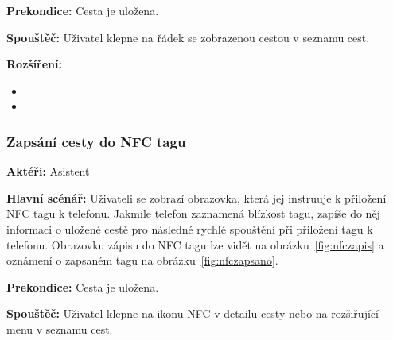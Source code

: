 \documentclass[czech,master,public,dept460,male,java,cpdeclaration]{diploma}
\newcommand{\usecase}[2]{\subsubsection{#1}\label{#2}}
\begin{document}
\vspace{0.1cm}
\noindent
\textbf{Prekondice:} Cesta je uložena.

\vspace{0.1cm}
\noindent
\textbf{Spouštěč:} Uživatel klepne na řádek se zobrazenou cestou v seznamu cest.

\vspace{0.1cm}
\noindent
\textbf{Rozšíření:}
\begin{itemize}
  \item {}
  \item {}
\end{itemize}






\usecase{Zapsání cesty do NFC tagu}{nfczapis}
\textbf{Aktéři:} Asistent

\vspace{0.1cm}
\noindent
\textbf{Hlavní scénář:} Uživateli se zobrazí
obrazovka, která jej instruuje k přiložení NFC tagu k telefonu. Jakmile telefon zaznamená blízkost tagu,
zapíše do něj informaci o uložené cestě pro následné rychlé spouštění při přiložení tagu k telefonu.
Obrazovku zápisu do NFC tagu lze vidět na obrázku~\ref{fig:nfczapis} a oznámení o zapsaném tagu
na obrázku~\ref{fig:nfczapsano}.

\vspace{0.1cm}
\noindent
\textbf{Prekondice:} Cesta je uložena.

\vspace{0.1cm}
\noindent
\textbf{Spouštěč:} Uživatel klepne na ikonu NFC v detailu cesty nebo na rozšiřující menu v seznamu cest.
\end{document}
